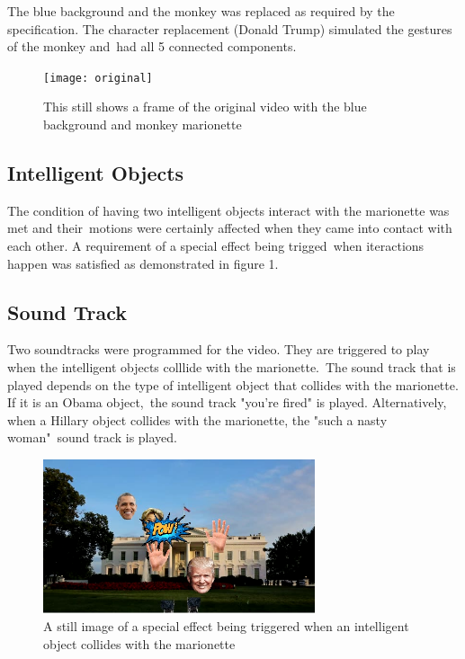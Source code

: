 \documentclass[12pt,a4paper]{article}
\begin{document}
      The blue background and the monkey was replaced as required by the specification. The character replacement (Donald Trump) simulated the gestures of the monkey and\
      had all 5 connected components.

      \begin{figure}[H]
        \texttt{[image: original]}
        \caption{This still shows a frame of the original video with the blue background and monkey marionette}
      \end{figure}

      \subsection{Intelligent Objects}

      The condition of having two intelligent objects interact with the marionette was met and their\
      motions were certainly affected when they came into contact with each other. A requirement of a special effect being trigged\
      when iteractions happen was satisfied as demonstrated in figure 1.

      \subsection{Sound Track}

      Two soundtracks were programmed for the video. They are triggered to play when the intelligent objects colllide with the marionette.\
      The sound track that is played depends on the type of intelligent object that collides with the marionette. If it is an Obama object,\
      the sound track "you're fired" is played. Alternatively, when a Hillary object collides with the marionette, the "such a nasty woman"\
      sound track is played.

        \begin{figure}[H]
          \includegraphics[width=8cm]{pow}
          \caption{A still image of a special effect being triggered when an intelligent object collides with the marionette}
        \end{figure}
\end{document}
